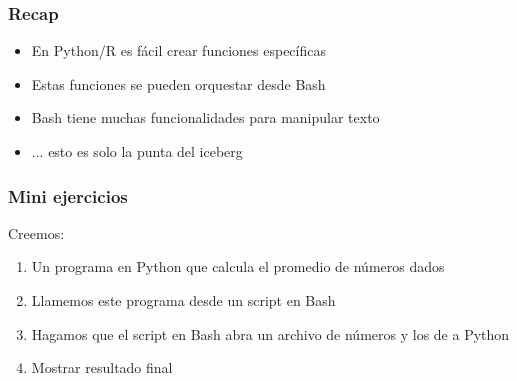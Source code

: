 \documentclass[14pt,aspectratio=169,xcolor=dvipsnames]{beamer}
\begin{document}
\begin{frame}\frametitle{Recap}
    \begin{itemize}
        \item En Python/R es fácil crear funciones específicas
        \item Estas funciones se pueden orquestar desde Bash
        \item Bash tiene muchas funcionalidades para manipular texto
        \item ... esto es solo la punta del iceberg
    \end{itemize}
\end{frame}
\begin{frame}
    \maketitle
\end{frame}
\begin{frame}[noframenumbering]\frametitle{Mini ejercicios}
    Creemos: 
    \begin{enumerate}
        \item Un programa en Python que calcula el promedio de números dados
        \item Llamemos este programa desde un script en Bash
        \item Hagamos que el script en Bash abra un archivo de números y los de a Python
        \item Mostrar resultado final
    \end{enumerate}
\end{frame}
\end{document}
